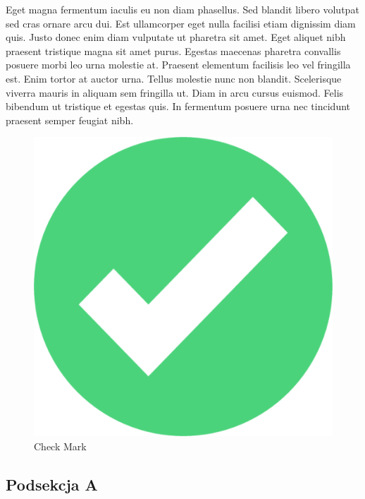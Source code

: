 \documentclass[12pt]{article}
\begin{document}
Eget magna fermentum iaculis eu non diam phasellus. Sed blandit libero volutpat sed cras ornare arcu dui. Est ullamcorper eget nulla facilisi etiam dignissim diam quis. Justo donec enim diam vulputate ut pharetra sit amet. Eget aliquet nibh praesent tristique magna sit amet purus. Egestas maecenas pharetra convallis posuere morbi leo urna molestie at. Praesent elementum facilisis leo vel fringilla est. Enim tortor at auctor urna. Tellus molestie nunc non blandit. Scelerisque viverra mauris in aliquam sem fringilla ut. Diam in arcu cursus euismod. Felis bibendum ut tristique et egestas quis. In fermentum posuere urna nec tincidunt praesent semper feugiat nibh.

\begin{figure}[h]
    \centering
    \includegraphics[width=0.5\linewidth]{checkmark1.png}
    \caption{Check Mark}
    \label{fig:checkmark}
\end{figure}



\subsection{Podsekcja A}
\end{document}
